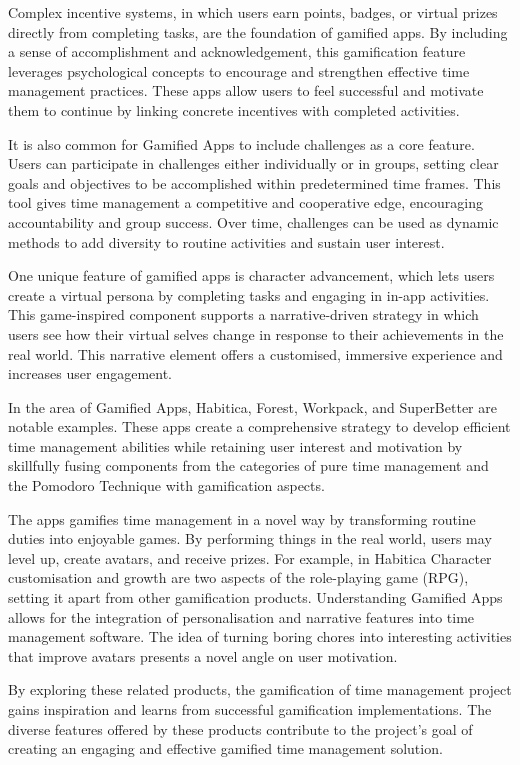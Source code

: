 \documentclass{l4proj}
\begin{document}
Complex incentive systems, in which users earn points, badges, or virtual prizes directly from completing tasks, are the foundation of gamified apps. By including a sense of accomplishment and acknowledgement, this gamification feature leverages psychological concepts to encourage and strengthen effective time management practices. These apps allow users to feel successful and motivate them to continue by linking concrete incentives with completed activities.

It is also common for Gamified Apps to include challenges as a core feature. Users can participate in challenges either individually or in groups, setting clear goals and objectives to be accomplished within predetermined time frames. This tool gives time management a competitive and cooperative edge, encouraging accountability and group success. Over time, challenges can be used as dynamic methods to add diversity to routine activities and sustain user interest.

One unique feature of gamified apps is character advancement, which lets users create a virtual persona by completing tasks and engaging in in-app activities. This game-inspired component supports a narrative-driven strategy in which users see how their virtual selves change in response to their achievements in the real world. This narrative element offers a customised, immersive experience and increases user engagement.

In the area of Gamified Apps, Habitica, Forest, Workpack, and SuperBetter are notable examples. These apps create a comprehensive strategy to develop efficient time management abilities while retaining user interest and motivation by skillfully fusing components from the categories of pure time management and the Pomodoro Technique with gamification aspects.

The apps gamifies time management in a novel way by transforming routine duties into enjoyable games. By performing things in the real world, users may level up, create avatars, and receive prizes. For example, in  Habitica Character customisation and growth are two aspects of the role-playing game (RPG), setting it apart from other gamification products. Understanding Gamified Apps allows for the integration of personalisation and narrative features into time management software. The idea of turning boring chores into interesting activities that improve avatars presents a novel angle on user motivation.

By exploring these related products, the gamification of time management project gains inspiration and learns from successful gamification implementations. The diverse features offered by these products contribute to the project's goal of creating an engaging and effective gamified time management solution.
\end{document}
